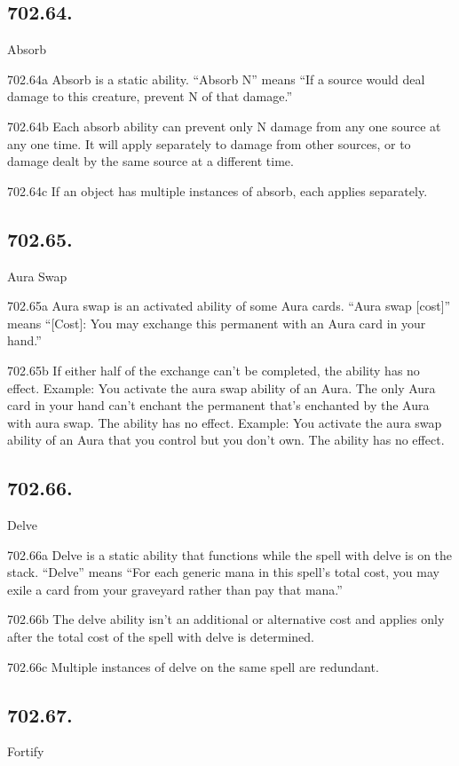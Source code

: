 \subsection*{702.64.}
Absorb

702.64a Absorb is a static ability. “Absorb N” means “If a source would deal damage to this creature, prevent N of that damage.”

702.64b Each absorb ability can prevent only N damage from any one source at any one time. It will apply separately to damage from other sources, or to damage dealt by the same source at a different time.

702.64c If an object has multiple instances of absorb, each applies separately.

\subsection*{702.65.}
Aura Swap

702.65a Aura swap is an activated ability of some Aura cards. “Aura swap [cost]” means “[Cost]: You may exchange this permanent with an Aura card in your hand.”

702.65b If either half of the exchange can’t be completed, the ability has no effect.
Example: You activate the aura swap ability of an Aura. The only Aura card in your hand can’t enchant the permanent that’s enchanted by the Aura with aura swap. The ability has no effect.
Example: You activate the aura swap ability of an Aura that you control but you don’t own. The ability has no effect.

\subsection*{702.66.}
Delve

702.66a Delve is a static ability that functions while the spell with delve is on the stack. “Delve” means “For each generic mana in this spell’s total cost, you may exile a card from your graveyard rather than pay that mana.”

702.66b The delve ability isn’t an additional or alternative cost and applies only after the total cost of the spell with delve is determined.

702.66c Multiple instances of delve on the same spell are redundant.

\subsection*{702.67.}
Fortify

